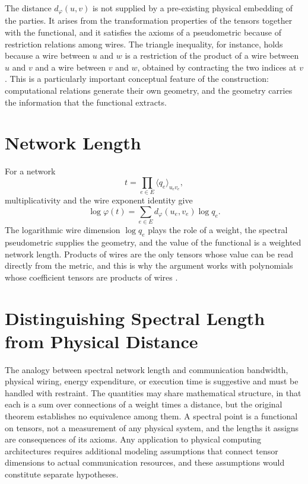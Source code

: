 \documentclass[11pt,letterpaper]{report}
\theoremstyle{plain}
\theoremstyle{definition}
\theoremstyle{remark}
\begin{document}
The distance $d_\varphi(u,v)$ is not supplied by a pre-existing physical embedding of the parties. It arises from the transformation properties of the tensors together with the functional, and it satisfies the axioms of a pseudometric because of restriction relations among wires. The triangle inequality, for instance, holds because a wire between $u$ and $w$ is a restriction of the product of a wire between $u$ and $v$ and a wire between $v$ and $w$, obtained by contracting the two indices at $v$. This is a particularly important conceptual feature of the construction: computational relations generate their own geometry, and the geometry carries the information that the functional extracts.

\section{Network Length}

For a network
\[
t=\prod_{e\in E}\langle q_e\rangle_{u_ev_e},
\]
multiplicativity and the wire exponent identity give
\[
\log\varphi(t)=\sum_{e\in E}d_\varphi(u_e,v_e)\log q_e.
\]
The logarithmic wire dimension $\log q_e$ plays the role of a weight, the spectral pseudometric supplies the geometry, and the value of the functional is a weighted network length. Products of wires are the only tensors whose value can be read directly from the metric, and this is why the argument works with polynomials whose coefficient tensors are products of wires \cite{Source2026}.

\section{Distinguishing Spectral Length from Physical Distance}

The analogy between spectral network length and communication bandwidth, physical wiring, energy expenditure, or execution time is suggestive and must be handled with restraint. The quantities may share mathematical structure, in that each is a sum over connections of a weight times a distance, but the original theorem establishes no equivalence among them. A spectral point is a functional on tensors, not a measurement of any physical system, and the lengths it assigns are consequences of its axioms. Any application to physical computing architectures requires additional modeling assumptions that connect tensor dimensions to actual communication resources, and these assumptions would constitute separate hypotheses.
\end{document}

